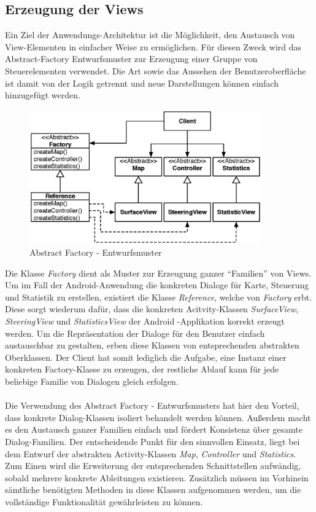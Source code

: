 \documentclass[10pt,a4paper]{article}
\begin{document}
  		\subsection{Erzeugung der Views}
  			Ein Ziel der Anwendungs-Architektur ist die Möglichkeit, den Austausch von View-Elementen in einfacher Weise zu ermöglichen. Für diesen
  			Zweck wird das Abstract-Factory Entwurfsmuster zur Erzeugung einer Gruppe von Steuerelementen verwendet. Die Art sowie das Aussehen der
  			Benutzeroberfläche ist damit von der Logik getrennt und neue Darstellungen können einfach hinzugefügt werden.
			\begin{figure}[h]
				\centering
				\includegraphics[width=10cm]{images/android_abstrfact.eps}
  				\caption{Abstract Factory - Entwurfsmuster}
  			\end{figure}
  			Die Klasse \textit{Factory} dient als Muster zur Erzeugung ganzer ``Familien'' von Views. Um im Fall der Android-Anwendung die konkreten
  			Dialoge für Karte, Steuerung und Statistik zu erstellen, existiert die Klasse \textit{Reference}, welche von \textit{Factory} erbt. Diese sorgt
  			wiederum dafür, dass die konkreten Acitvity-Klassen \textit{SurfaceView}, \textit{SteeringView} und \textit{StatisticsView} der Android
  			-Applikation korrekt erzeugt werden. Um die Repräsentation der Dialoge für den Benutzer einfach austauschbar zu gestalten, erben diese Klassen
  			von entsprechenden abstrakten Oberklassen. Der Client hat somit lediglich die Aufgabe, eine Instanz einer konkreten Factory-Klasse zu
  			erzeugen, der restliche Ablauf kann für jede beliebige Familie von Dialogen gleich erfolgen. \\ \\
  			Die Verwendung des Abstract Factory - Entwurfsmusters hat hier den Vorteil, dass konkrete Dialog-Klassen isoliert behandelt werden können.
  			Außerdem macht es den Austausch ganzer Familien einfach und fördert Konsistenz über gesamte Dialog-Familien. Der entscheidende Punkt für
  			den sinnvollen Einsatz, liegt bei dem Entwurf der abstrakten Activity-Klassen \textit{Map}, \textit{Controller} und \textit{Statistics}. Zum Einen
  			wird die Erweiterung der entsprechenden Schnittstellen aufwändig, sobald mehrere konkrete Ableitungen existieren. Zusätzlich müssen im
 			Vorhinein sämtliche benötigten Methoden in diese Klassen aufgenommen werden, um die vollständige Funktionalität gewährleisten zu können. 
\end{document}

